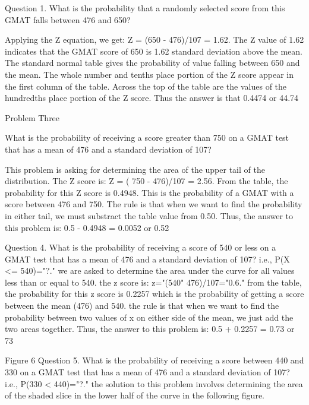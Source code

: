 Question 1. What is the probability that a randomly selected score from this GMAT falls between 476 and 650?

 
Applying the Z equation, we get: Z = (650 - 476)/107 = 1.62. The Z value of 1.62 indicates that the GMAT score of 650 is 1.62 standard deviation above the mean. The standard normal table gives the probability of value falling between 650 and the mean. The whole number and tenths place portion of the Z score appear in the first column of the table. Across the top of the table are the values of the hundredths place portion of the Z score. Thus the answer is that 0.4474 or 44.74%

Problem Three
 
What is the probability of receiving a score greater than 750 on a GMAT test that has a mean of 476 and a standard deviation of 107?
 
 
 

 
This problem is asking for determining the area of the upper tail of the distribution. The Z score is: Z = ( 750 - 476)/107 = 2.56. From the table, the probability for this Z score is 0.4948. This is the probability of a GMAT with a score between 476 and 750. The rule is that when we want to find the probability in either tail, we must substract the table value from 0.50. Thus, the answer to this problem is: 0.5 - 0.4948 = 0.0052 or 0.52%
 
Question 4.
What is the probability of receiving a score of 540 or less on a GMAT test that has a mean of 476 and a standard deviation of 107? i.e., P(X <= 540)="?." we are asked to determine the area under the curve for all values less than or equal to 540. the z score is: z="(540" 476)/107="0.6." from the table, the probability for this z score is 0.2257 which is the probability of getting a score between the mean (476) and 540. the rule is that when we want to find the probability between two values of x on either side of the mean, we just add the two areas together. Thus, the answer to this problem is: 0.5 + 0.2257 = 0.73 or 73%

Figure 6
Question 5.
 What is the probability of receiving a score between 440 and 330 on a GMAT test that has a mean of 476 and a standard deviation of 107? i.e., P(330 < 440)="?." the solution to this problem involves determining the area of the shaded slice in the lower half of the curve in the following figure.

